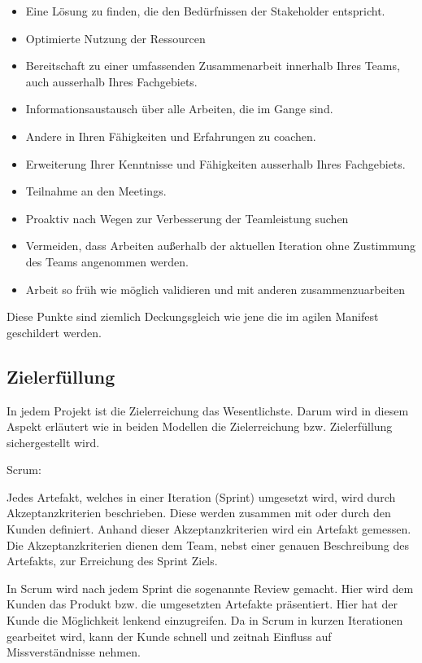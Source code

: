 \begin{itemize}
	\item Eine Lösung zu finden, die den Bedürfnissen der Stakeholder entspricht.
	\item Optimierte Nutzung der Ressourcen
	\item Bereitschaft zu einer umfassenden Zusammenarbeit innerhalb Ihres Teams, auch ausserhalb Ihres Fachgebiets.
	\item Informationsaustausch über alle Arbeiten, die im Gange sind.
	\item Andere in Ihren Fähigkeiten und Erfahrungen zu coachen.
	\item Erweiterung Ihrer Kenntnisse und Fähigkeiten ausserhalb Ihres Fachgebiets.
	\item Teilnahme an den Meetings.
	\item Proaktiv nach Wegen zur Verbesserung der Teamleistung suchen
	\item Vermeiden, dass Arbeiten außerhalb der aktuellen Iteration ohne Zustimmung des Teams angenommen werden.
	\item Arbeit so früh wie möglich validieren und mit anderen zusammenzuarbeiten
\end{itemize}

Diese Punkte sind ziemlich Deckungsgleich wie jene die im agilen Manifest geschildert werden. 

\subsection{Zielerfüllung}

In jedem Projekt ist die Zielerreichung das Wesentlichste. Darum wird in diesem Aspekt erläutert wie in beiden Modellen die Zielerreichung bzw. Zielerfüllung sichergestellt wird.

\medskip
{\Large Scrum:}\cite{scrumAC} \medskip

Jedes Artefakt, welches in einer Iteration (Sprint) umgesetzt wird, wird durch Akzeptanzkriterien beschrieben. Diese werden zusammen mit oder durch den Kunden definiert. Anhand dieser Akzeptanzkriterien wird ein Artefakt gemessen. Die Akzeptanzkriterien dienen dem Team, nebst einer genauen Beschreibung des Artefakts, zur Erreichung des Sprint Ziels.

In Scrum wird nach jedem Sprint die sogenannte Review gemacht. Hier wird dem Kunden das Produkt bzw. die umgesetzten Artefakte präsentiert. Hier hat der Kunde die Möglichkeit lenkend einzugreifen. Da in Scrum in kurzen Iterationen gearbeitet wird, kann der Kunde schnell und zeitnah Einfluss auf Missverständnisse nehmen.

